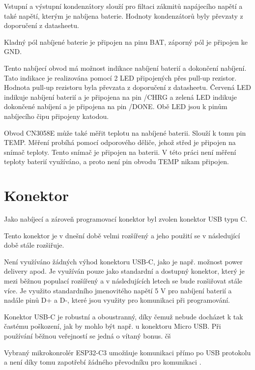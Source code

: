 Vstupní a výstupní kondenzátory slouží pro filtaci zákmitů napájecího napětí a také napětí, kterým je nabíjena baterie. Hodnoty kondenzátorů byly převzaty
z doporučení z datasheetu.

Kladný pól nabíjené baterie je připojen na pinu BAT, záporný pól je připojen ke GND. 

Tento nabíjecí obvod má možnost indikace nabíjení baterií a dokončení nabíjení. Tato indikace je realizována pomocí 2 LED připojených přes pull-up rezistor. Hodnota
pull-up rezistoru byla převzata z doporučení z datasheetu. Červená LED indikuje nabíjení baterií a je připojena na pin /CHRG a zelená LED indikuje dokončené nabíjení 
a je připojena na pin /DONE. Obě LED jsou k pinům nabíjecího čipu připojeny katodou. 

Obvod CN3058E může také měřit teplotu na nabíjené baterii. Slouží k tomu pin TEMP. Měření probíhá pomocí odporového děliče, jehož střed je připojen na snímač teploty. Tento snímač je připojen
na baterii. V této práci není měření teploty baterií využíváno, a proto není pin obvodu TEMP nikam připojen. 


\section{Konektor}
Jako nabíjecí a zároveň programovací konektor byl zvolen konektor USB typu C.

Tento konektor je v dnešní době velmi rozšířený a jeho použití se v následující době stále rozšiřuje. 

Není využíváno žádných výhod konektoru USB-C, jako je např. možnost power delivery apod. Je využíván pouze jako standardní a dostupný konektor, který je mezi běžnou
populací rozšířený a v následujících letech se bude rozšiřovat stále více. Je využito standardního jmenovitého napětí 5 V pro nabíjení baterií a nadále pinů D+ a D-, 
které jsou využity pro komunikaci při programování. 

Konektor USB-C je robustní a oboustranný, díky čemuž nebude docházet k tak častému poškození, jak by mohlo být např. u konektoru Micro USB. Při používání běžnou veřejností
se jedná o vítaný bonus. čš

Vybraný mikrokonrolér ESP32-C3 umožňuje komunikaci přímo po USB protokolu a není díky tomu zapotřebí žádného převodníku pro komunikaci \cite{ESP_C3_dtsh}. %





